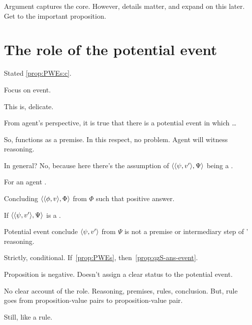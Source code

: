 \begin{note}
  Argument captures the core.
  However, details matter, and expand on this later.
  Get to the important proposition.
\end{note}

\section{The role of the potential event}
\label{sec:no-premise}

\begin{note}
  Stated \ref{prop:PWEs:c}.

  Focus on event.

  This is, delicate.

  From agent's perspective, it is true that there is a potential event in which \dots

  So, functions as a premise.
  In this respect, no problem.
  Agent will witness reasoning.
\end{note}

\begin{note}
  In general?
  No, because here there's the assumption of \(\langle \langle \psi, v' \rangle, \Psi \rangle\) being a \requ{}.

  \begin{proposition}
    \label{prop:qzS-ans-event}
    For an agent \vAgent{}.

    Concluding \(\langle \langle \phi, v \rangle, \Phi \rangle\) from \(\Phi\) such that positive answer.

    If \(\langle \langle \psi, v' \rangle, \Psi \rangle\) is a \requ{}.

    Potential event conclude \(\langle \psi, v' \rangle\) from \(\Psi\) is not a premise or intermediary step of \vAgent{}' reasoning.
  \end{proposition}

  Strictly, conditional.
  If~\autoref{prop:PWEs}, then~\autoref{prop:qzS-ans-event}.
\end{note}

\begin{note}
  Proposition is negative.
  Doesn't assign a clear status to the potential event.

  No clear account of the role.
  Reasoning, premises, rules, conclusion.
  But, rule goes from proposition-value pairs to proposition-value pair.

  Still, like a rule.
\end{note}


